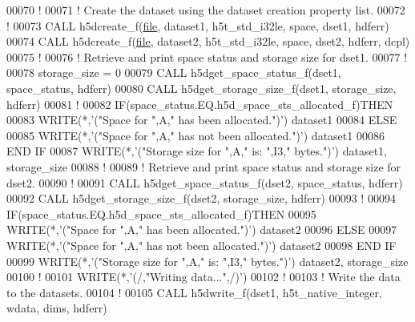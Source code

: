 \begin{DoxyCode}
00070   \textcolor{comment}{!}
00071   \textcolor{comment}{! Create the dataset using the dataset creation property list.}
00072   \textcolor{comment}{!}
00073   \textcolor{keyword}{CALL }h5dcreate\_f(\hyperlink{structfile}{file}, dataset1, h5t\_std\_i32le, space, dset1, hdferr)
00074   \textcolor{keyword}{CALL }h5dcreate\_f(\hyperlink{structfile}{file}, dataset2, h5t\_std\_i32le, space, dset2, hdferr, dcpl)
00075   \textcolor{comment}{! }
00076   \textcolor{comment}{! Retrieve and print space status and storage size for dset1.}
00077   \textcolor{comment}{!}
00078   storage\_size = 0
00079   \textcolor{keyword}{CALL }h5dget\_space\_status\_f(dset1, space\_status, hdferr)
00080   \textcolor{keyword}{CALL }h5dget\_storage\_size\_f(dset1, storage\_size, hdferr)
00081   \textcolor{comment}{!}
00082   \textcolor{keywordflow}{IF}(space\_status.EQ.h5d\_space\_sts\_allocated\_f)\textcolor{keywordflow}{THEN}
00083      \textcolor{keyword}{WRITE}(*,\textcolor{stringliteral}{'("Space for ",A," has been allocated.")'}) dataset1
00084   \textcolor{keywordflow}{ELSE}
00085      \textcolor{keyword}{WRITE}(*,\textcolor{stringliteral}{'("Space for ",A," has not been allocated.")'}) dataset1
00086 \textcolor{keywordflow}{  END IF}
00087   \textcolor{keyword}{WRITE}(*,\textcolor{stringliteral}{'("Storage size for ",A," is: ",I3," bytes.")'}) dataset1, storage\_size
00088   \textcolor{comment}{!}
00089   \textcolor{comment}{! Retrieve and print space status and storage size for dset2.}
00090   \textcolor{comment}{!}
00091   \textcolor{keyword}{CALL }h5dget\_space\_status\_f(dset2, space\_status, hdferr)
00092   \textcolor{keyword}{CALL }h5dget\_storage\_size\_f(dset2, storage\_size, hdferr)
00093   \textcolor{comment}{!}
00094   \textcolor{keywordflow}{IF}(space\_status.EQ.h5d\_space\_sts\_allocated\_f)\textcolor{keywordflow}{THEN}
00095      \textcolor{keyword}{WRITE}(*,\textcolor{stringliteral}{'("Space for ",A," has been allocated.")'}) dataset2
00096   \textcolor{keywordflow}{ELSE}
00097      \textcolor{keyword}{WRITE}(*,\textcolor{stringliteral}{'("Space for ",A," has not been allocated.")'}) dataset2
00098 \textcolor{keywordflow}{  END IF}
00099   \textcolor{keyword}{WRITE}(*,\textcolor{stringliteral}{'("Storage size for ",A," is: ",I3," bytes.")'}) dataset2, storage\_size
00100   \textcolor{comment}{!}
00101   \textcolor{keyword}{WRITE}(*,\textcolor{stringliteral}{'(/,"Writing data...",/)'})
00102   \textcolor{comment}{!}
00103   \textcolor{comment}{! Write the data to the datasets.}
00104   \textcolor{comment}{!}
00105   \textcolor{keyword}{CALL }h5dwrite\_f(dset1, h5t\_native\_integer, wdata, dims, hdferr)

\end{DoxyCode}
